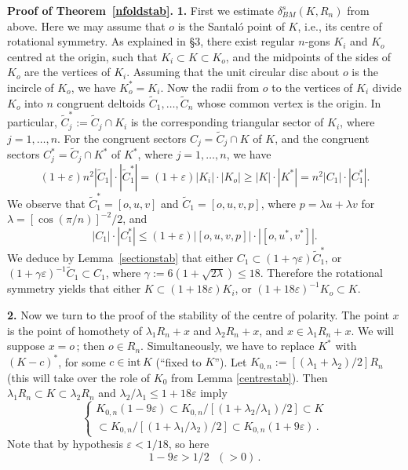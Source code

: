 \documentclass[12pt]{article}
\begin{document}
{\bf Proof of Theorem~\ref{nfoldstab}.}
{\bf{1.}} First we estimate $\delta _{BM}^s (K,R_n)$ from above.
Here we may assume that $o$ is the Santal\'o point of $K$, i.e., its centre of
rotational symmetry.
As explained in \S 3, there exist
regular $n$-gons $K_i$ and $K_o$ centred at the origin,
such that $K_i\subset K \subset K_o$,
and the midpoints of the sides of $K_o$ are the vertices of $K_i$.
Assuming that the unit circular disc about $o$ is the incircle of
$K_o$, we have $K_o^*=K_i$. Now the radii from $o$ to 
the vertices of $K_i$
divide $K_o$ into $n$ congruent deltoids
$\widetilde{C}_1,\ldots,\widetilde{C}_n$ whose
common vertex is the origin. In particular,
$\widetilde{C}_j^*:=\widetilde{C}_j\cap K_i$
is the corresponding triangular sector of $K_i$, where
$j=1,\ldots,n$. For
the congruent sectors $C_j=\widetilde{C}_j\cap K$
of $K$, and the congruent sectors $C_j^*=\widetilde{C}_j\cap K^*$
of $K^*$, where $j=1,\ldots,n$, we have
$$
(1+\varepsilon)n^2|\widetilde{C}_1|\cdot |\widetilde{C}_1^*|
= (1+\varepsilon)|K_i|\cdot|K_o|\geq |K|\cdot|K^*|=
n^2|C_1|\cdot|C_1^*|.
$$
We observe that $\widetilde{C}_1^*=[o,u,v]$ and
$\widetilde{C}_1=[o,u,v,p]$, where
$p=\lambda u+\lambda v$ for $\lambda=[\cos(\pi/n)]^{-2}/2$,
and
$$
|C_1|\cdot|C_1^*|\leq (1+\varepsilon)|[o,u,v,p]|\cdot |[o,u^*,v^*]|.
$$
We deduce by Lemma~\ref{sectionstab}
that either $C_1\subset(1+\gamma\varepsilon)\widetilde{C}_1^*$, or
$(1+\gamma\varepsilon)^{-1}\widetilde{C}_1\subset C_1$, where
$\gamma:=6(1+\sqrt{2\lambda})\le 18 $.
Therefore the rotational symmetry yields that
either $K\subset (1+18 \varepsilon )K_i$, or
$(1+18 \varepsilon )^{-1}K_o\subset K$.

{\bf{2.}} Now we turn to the proof of the stability of the centre of polarity.
The point $x$ is the point of homothety of $\lambda _1 R_n+x$ and $\lambda _2
R_n+x$, and $x \in \lambda _1 R_n+x$. We will suppose $x=o$\,; then $o \in
R_n$. Simultaneously,
we have to replace $K^*$ with $(K-c)^*$, for some $c \in {\text{int}}\,K$
(``fixed to $K$'').
Let
$K_{0,n}:=
[(\lambda _1 +\lambda _2)/2]R_n$ (this will take over the role of $K_0$ from
Lemma \ref{centrestab}). Then $\lambda _1 R_n \subset K \subset
\lambda _2 R_n$ and $\lambda _2 / \lambda _1 \le 1+18 \varepsilon $ imply
\begin{equation}
\label{lambda12}
\begin{cases}
K_{0,n} (1-9 \varepsilon ) \subset K_{0,n}/[(1+\lambda _2 / \lambda _1)/2]
\subset K \\
\subset K_{0,n}/[(1+\lambda _1 / \lambda _2 )/2] \subset K_{0,n} (1+9
\varepsilon)\,.
\end{cases}
\end{equation}
Note that by hypothesis $\varepsilon < 1/18$, 
so here 
\begin{equation}
\label{epsilon}
1-9 \varepsilon > 1/2 \,\,\,\,(>0)\,.
\end{equation}
\end{document}
